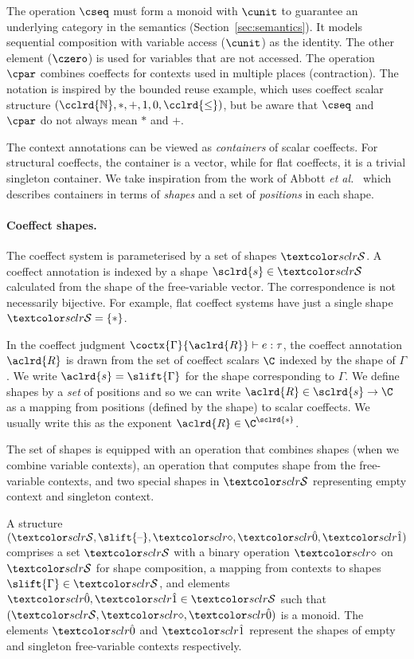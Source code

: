 \noindent
The operation $\cseq$ must form a monoid with $\cunit$ to guarantee an underlying 
category in the semantics (Section~\ref{sec:semantics}). 
It models sequential composition with variable access
($\cunit$) as the identity. The other element ($\czero$) is used for
variables that are not accessed. The operation $\cpar$ combines coeffects
for contexts used in multiple places (contraction). 
The notation is inspired by the bounded reuse example, which uses coeffect scalar structure
$(\cclrd{\mathbb{N}}, \ast, +, 1,0, \cclrd{\leq})$, but be aware that $\cseq$ and $\cpar$ do
not always mean $\ast$ and $+$.

The context annotations can be viewed as \emph{containers} of scalar coeffects.
For structural coeffects, the container is a vector, while for flat coeffects, it is
a trivial singleton container. We take inspiration from the work of Abbott \emph{et al.}~\cite{abbott2005containers}
which describes containers in terms of \emph{shapes} and a set of \emph{positions} in each shape.

\paragraph{Coeffect shapes.}
The coeffect system is parameterised by a set of shapes $\SH$. A coeffect annotation 
is indexed by a shape $\sclrd{s} \in \SH$ calculated from the shape of the free-variable vector. The correspondence is not necessarily 
bijective. For example, flat coeffect systems have just a single shape $\SH = \{ \ast \}$.

In the coeffect judgment $\coctx{\Gamma}{\aclrd{R}} \vdash e : \tau$, the coeffect annotation
$\aclrd{R}$ is drawn from the set of coeffect scalars $\C$ indexed by the shape of $\Gamma$.
We write $\aclrd{s} = \slift{\Gamma}$ for the shape corresponding to $\Gamma$. We define shapes by a 
\emph{set} of positions and so we can write $\aclrd{R} \in \sclrd{s} \rightarrow \C$ as a
mapping from positions (defined by the shape) to scalar coeffects. We usually write this as 
the exponent $\aclrd{R} \in \C^{\sclrd{s}}$.

The set of shapes is equipped with an operation that combines shapes (when we combine 
variable contexts), an operation that computes shape from the free-variable contexts, 
and two special shapes in $\SH$ representing empty context and singleton context. 

\begin{definition}
  A \emph{} structure $(\SH, \slift{\textnormal{--}}, \stimes,
  \sempty, \sunit)$ comprises a set $\SH$ with a binary operation
  $\stimes$ on $\SH$ for shape composition, a mapping from contexts to
  shapes $\slift{\Gamma} \in \SH$, and elements $\sempty,\sunit \in
  \SH$ such that $(\SH, \stimes, \sempty)$ is a monoid. The 
  elements $\sempty$ and $\sunit$ represent the shapes of empty and
  singleton free-variable contexts respectively.
\end{definition}

